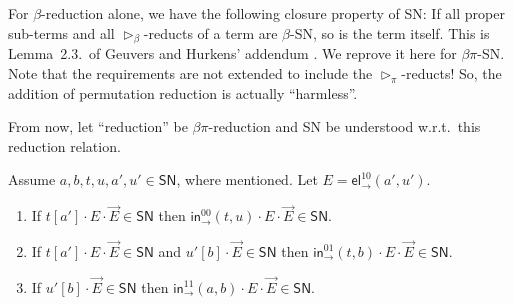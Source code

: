 \documentclass[a4paper,USenglish,cleveref, autoref, thm-restate]{lipics-v2019}
\newcommand{\wrt}{w.r.t.\xspace}
\newcommand{\tin}{\ensuremath{\mathsf{in}}}
\newcommand{\inn}[2]{\ensuremath{\tin_{#1}^{#2}}}
\newcommand{\tel}{\mathsf{el}}
\newcommand{\el}[2]{\ensuremath{\tel_{#1}^{#2}}}
\newcommand{\whd}[1][]{\rhd_{#1}}
\newcommand{\SN}{\mathsf{SN}}
\begin{document}
For $\beta$-reduction alone, we have the following closure property of
SN:  If all proper sub-terms and all $\whd[\beta]$-reducts of a term
are $\beta$-SN, so is the term itself.  This is Lemma~2.3.\ of Geuvers and
Hurkens' addendum \cite{geuversHurkens:addendumTypes17}.  We reprove
it here for $\beta\pi$-SN.  Note that the requirements are not extended to
include the $\whd[\pi]$-reducts!
So, the addition of permutation reduction is actually ``harmless''.

From now, let ``reduction'' be $\beta\pi$-reduction and SN be
understood \wrt\ this reduction relation.

\begin{lemma}
  \label{lem:whexp}
  Assume $a,b,t,u,a',u' \in \SN$, where mentioned.
  Let $E = \el\to{10}(a',u')$.
  \begin{enumerate}
  \item \label{it:zerozero}
    If $t[a'] \cdot E \cdot \vec E \in \SN$ then
    $\inn\to{00}(t,u) \cdot E \cdot \vec E \in \SN$.
  \item \label{it:zeroone}
    If $t[a'] \cdot E \cdot \vec E \in \SN$
    and $u'[b] \cdot \vec E \in \SN$
    then $\inn\to{01}(t,b) \cdot E \cdot \vec E \in \SN$.
  \item \label{it:oneone}
    If  $u'[b] \cdot \vec E \in \SN$
    then $\inn\to{11}(a,b) \cdot E \cdot \vec E \in \SN$.
  \end{enumerate}
\end{lemma}
\end{document}
